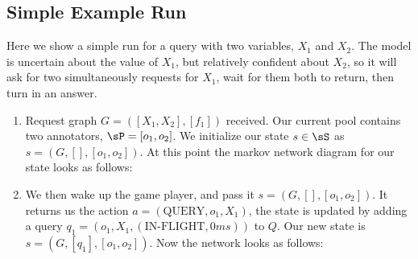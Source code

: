 \subsection{Simple Example Run}


Here we show a simple run for a query with two variables, $X_1$ and $X_2$. The model is uncertain about the value of $X_1$, but relatively confident about $X_2$, so it will ask for two simultaneously requests for $X_1$, wait for them both to return, then turn in an answer.

\begin{enumerate}
\item Request graph $G = ([X_1, X_2], [f_1])$ received.
 Our current pool contains two annotators, $\sP = [o_1, o_2]$.
 We initialize our state $s \in \sS$ as $s = (G, [], [o_1, o_2])$. At this point the markov network diagram for our state looks as follows:

\begin{center}
\end{center}

\item We then wake up the game player, and pass it $s = (G, [], [o_1, o_2])$.
 It returns us the action $a = (\text{QUERY}, o_1, X_1)$, the state is updated by adding a query $q_1 = (o_1, X_1, (\text{IN-FLIGHT}, 0ms))$ to $Q$.
 Our new state is $s = (G, [q_1], [o_1, o_2])$.
 Now the network looks as follows:

\begin{center}
\end{center}


\end{enumerate}
